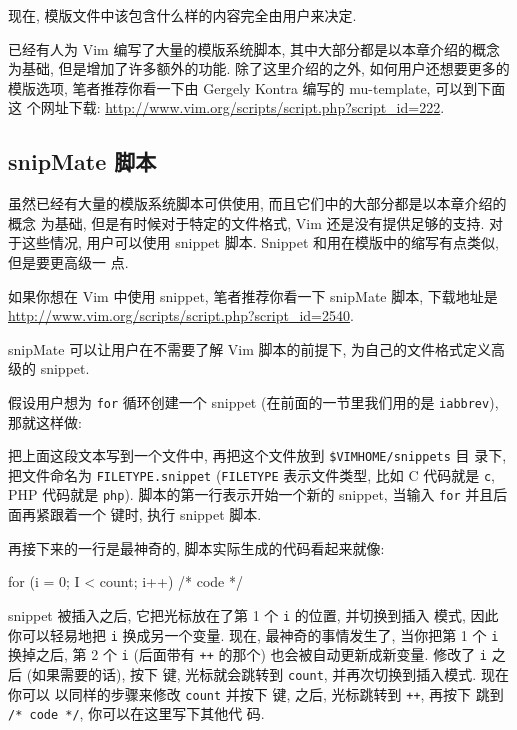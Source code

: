 现在, 模版文件中该包含什么样的内容完全由用户来决定.

\begin{warning}
    已经有人为 Vim 编写了大量的模版系统脚本, 其中大部分都是以本章介绍的概念为基础,
    但是增加了许多额外的功能. 除了这里介绍的之外, 如何用户还想要更多的模版选项,
    笔者推荐你看一下由 Gergely Kontra 编写的 mu-template, 可以到下面这
    个网址下载: \url{http://www.vim.org/scripts/script.php?script_id=222}.
\end{warning}

\subsection{snipMate 脚本}
\label{subsec:snippets_with_the_snipmate_script}

虽然已经有大量的模版系统脚本可供使用, 而且它们中的大部分都是以本章介绍的概念
为基础, 但是有时候对于特定的文件格式, Vim 还是没有提供足够的支持. 对于这些情况,
用户可以使用 snippet 脚本. Snippet 和用在模版中的缩写有点类似, 但是要更高级一
点.

如果你想在 Vim 中使用 snippet, 笔者推荐你看一下 snipMate 脚本, 下载地址是
\url{http://www.vim.org/scripts/script.php?script_id=2540}.

snipMate 可以让用户在不需要了解 Vim 脚本的前提下, 为自己的文件格式定义高级的
snippet.

假设用户想为 \texttt{for} 循环创建一个 snippet (在前面的一节里我们用的是 
\texttt{iabbrev}),  那就这样做:
把上面这段文本写到一个文件中, 再把这个文件放到 \texttt{\$VIMHOME/snippets} 目
录下, 把文件命名为 \texttt{FILETYPE.snippet} (\texttt{FILETYPE} 表示文件类型,
比如 C 代码就是 \texttt{c}, PHP 代码就是 \texttt{php}).
脚本的第一行表示开始一个新的 snippet, 当输入 \texttt{for} 并且后面再紧跟着一个
 键时, 执行 snippet 脚本.

再接下来的一行是最神奇的, 脚本实际生成的代码看起来就像:
\begin{vimcmd}
    for (i = 0; I < count; i++) {
        /* code */
    }
\end{vimcmd}

snippet 被插入之后, 它把光标放在了第 1 个 \texttt{i} 的位置, 并切换到插入
模式, 因此你可以轻易地把 \texttt{i} 换成另一个变量. 现在, 最神奇的事情发生了,
当你把第 1 个 \texttt{i} 换掉之后, 第 2 个 \texttt{i} (后面带有 \texttt{++}
的那个) 也会被自动更新成新变量. 修改了 \texttt{i} 之后 (如果需要的话), 按下
 键, 光标就会跳转到 \texttt{count}, 并再次切换到插入模式. 现在你可以
以同样的步骤来修改 \texttt{count} 并按下  键, 之后, 光标跳转到
\texttt{++}, 再按下  跳到 \texttt{/* code */}, 你可以在这里写下其他代
码.

